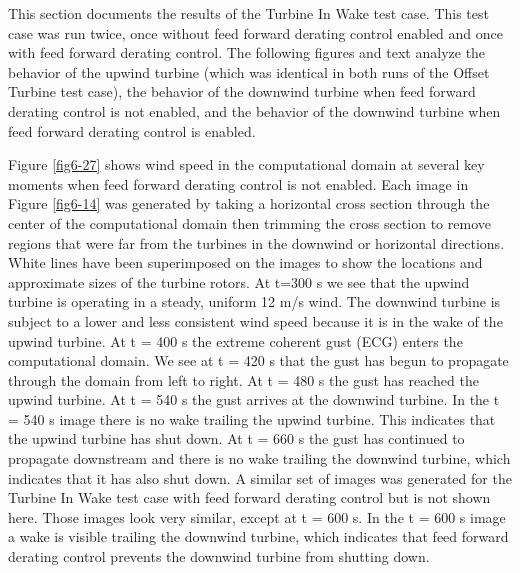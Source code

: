 This section documents the results of the Turbine In Wake test case. This test case was run twice, once without feed forward derating control enabled and once with feed forward derating control. The following figures and text analyze the behavior of the upwind turbine (which was identical in both runs of the Offset Turbine test case), the behavior of the downwind turbine when feed forward derating control is not enabled, and the behavior of the downwind turbine when feed forward derating control is enabled.

Figure \ref{fig6-27} shows wind speed in the computational domain at several key moments when feed forward derating control is not enabled. Each image in Figure \ref{fig6-14} was generated by taking a horizontal cross section through the center of the computational domain then trimming the cross section to remove regions that were far from the turbines in the downwind or horizontal directions. White lines have been superimposed on the images to show the locations and approximate sizes of the turbine rotors. At t=300 s we see that the upwind turbine is operating in a steady, uniform 12 m/s wind. The downwind turbine is subject to a lower and less consistent wind speed because it is in the wake of the upwind turbine. At t = 400 s the extreme coherent gust (ECG) enters the computational domain. We see at t = 420 s that the gust has begun to propagate through the domain from left to right. At t = 480 s the gust has reached the upwind turbine. At t = 540 s the gust arrives at the downwind turbine. In the t = 540 s image there is no wake trailing the upwind turbine. This indicates that the upwind turbine has shut down. At t = 660 s the gust has continued to propagate downstream and there is no wake trailing the downwind turbine, which indicates that it has also shut down. A similar set of images was generated for the Turbine In Wake test case with feed forward derating control but is not shown here. Those images look very similar, except at t = 600 s. In the t = 600 s image a wake is visible trailing the downwind turbine, which indicates that feed forward derating control prevents the downwind turbine from shutting down.

